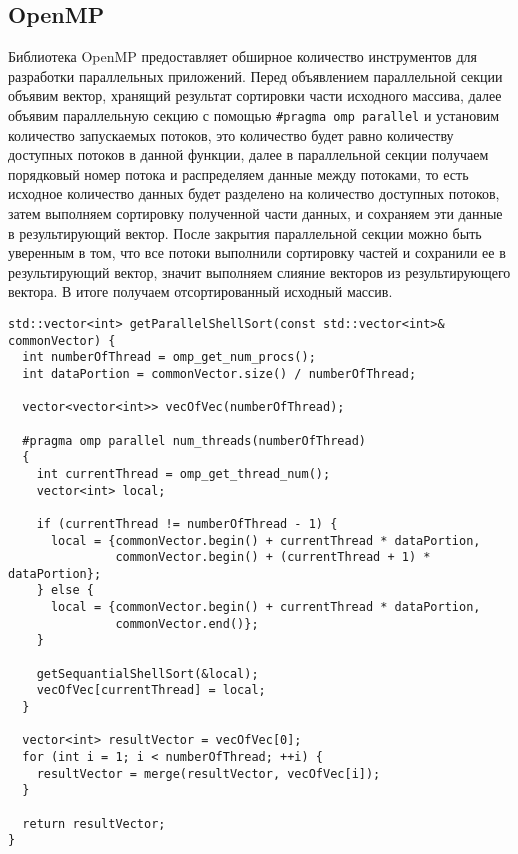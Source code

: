 \documentclass{report}
\begin{document}
\subsection*{OpenMP}
\par Библиотека OpenMP предоставляет обширное количество инструментов для разработки параллельных приложений. Перед объявлением параллельной секции объявим вектор, хранящий результат сортировки части исходного массива, далее объявим параллельную секцию с помощью  \verb|#pragma omp parallel| и установим количество запускаемых потоков, это количество будет равно количеству доступных потоков в данной функции, далее в параллельной секции получаем порядковый номер потока и распределяем данные между потоками, то есть исходное количество данных будет разделено на количество доступных потоков, затем выполняем сортировку полученной части данных, и сохраняем эти данные в результирующий вектор. После закрытия параллельной секции можно быть уверенным в том, что все потоки выполнили сортировку частей и сохранили ее в результирующий вектор, значит выполняем слияние векторов из результирующего вектора. В итоге получаем отсортированный исходный массив.

\begin{lstlisting}
std::vector<int> getParallelShellSort(const std::vector<int>& commonVector) {
  int numberOfThread = omp_get_num_procs();
  int dataPortion = commonVector.size() / numberOfThread;

  vector<vector<int>> vecOfVec(numberOfThread);

  #pragma omp parallel num_threads(numberOfThread)
  {
    int currentThread = omp_get_thread_num();
    vector<int> local;

    if (currentThread != numberOfThread - 1) {
      local = {commonVector.begin() + currentThread * dataPortion,
               commonVector.begin() + (currentThread + 1) * dataPortion};
    } else {
      local = {commonVector.begin() + currentThread * dataPortion,
               commonVector.end()};
    }

    getSequantialShellSort(&local);
    vecOfVec[currentThread] = local;
  }

  vector<int> resultVector = vecOfVec[0];
  for (int i = 1; i < numberOfThread; ++i) {
    resultVector = merge(resultVector, vecOfVec[i]);
  }

  return resultVector;
}
\end{lstlisting}

\newpage
\end{document}
